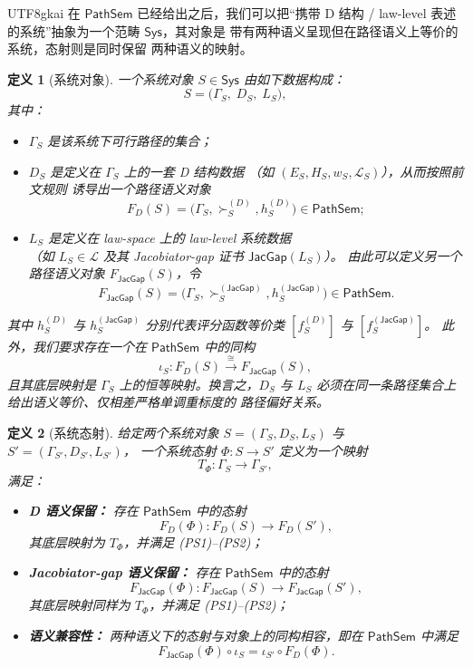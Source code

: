 \documentclass[12pt]{article}
\newtheorem{definition}{定义}[section]
\newcommand{\JacGap}{\mathsf{JacGap}}
\begin{document}
\begin{CJK*}{UTF8}{gkai}
在 $\mathsf{PathSem}$ 已经给出之后，我们可以把“携带 D 结构 /
law-level 表述的系统”抽象为一个范畴 $\mathsf{Sys}$，其对象是
带有两种语义呈现但在路径语义上等价的系统，态射则是同时保留
两种语义的映射。

\begin{definition}[系统对象]
一个\emph{系统对象} $S\in\mathsf{Sys}$ 由如下数据构成：
  \[
    S
    =
    \bigl(
      \Gamma_S,\;
      D_S,\;
      L_S
    \bigr),
  \]
  其中：
  \begin{itemize}
    \item $\Gamma_S$ 是该系统下可行路径的集合；
    \item $D_S$ 是定义在 $\Gamma_S$ 上的一套 D 结构数据
          （如 $(E_S,H_S,w_S,\mathcal{L}_S)$），从而按照前文规则
          诱导出一个路径语义对象
          \[
            F_D(S)
            =
            \bigl(\Gamma_S,\succ^{(D)}_S,h^{(D)}_S\bigr)
            \in\mathsf{PathSem};
          \]
    \item $L_S$ 是定义在 law-space 上的 law-level 系统数据\\
          （如 $L_S\in\mathcal{L}$ 及其 Jacobiator-gap 证书
          $\JacGap(L_S)$）。
          由此可以定义另一个路径语义对象 $F_{\JacGap}(S)$，令
          {\small
          \[
            F_{\JacGap}(S)
            =
            \bigl(\Gamma_S,\succ^{(\JacGap)}_S,h^{(\JacGap)}_S\bigr)
            \in\mathsf{PathSem}.
          \]
          }
  \end{itemize}
  其中 $h^{(D)}_S$ 与 $h^{(\JacGap)}_S$ 分别代表评分函数等价类
  $[f^{(D)}_S]$ 与 $[f^{(\JacGap)}_S]$。
  此外，我们要求存在一个在 $\mathsf{PathSem}$ 中的同构
  \[
    \iota_S:
    F_D(S)
    \xrightarrow{\;\cong\;}
    F_{\JacGap}(S),
  \]
  且其底层映射是 $\Gamma_S$ 上的恒等映射。换言之，$D_S$ 与 $L_S$
  必须在同一条路径集合上给出语义等价、仅相差严格单调重标度的
  路径偏好关系。
\end{definition}

\begin{definition}[系统态射]
给定两个系统对象
  $S=(\Gamma_S,D_S,L_S)$
  与
  $S'=(\Gamma_{S'},D_{S'},L_{S'})$，
  一个\emph{系统态射} $\Phi:S\to S'$ 定义为一个映射
  \[
    T_\Phi:\Gamma_S\longrightarrow\Gamma_{S'},
  \]
  满足：
  \begin{itemize}
    \item[(SM1)] \textbf{D 语义保留：}
      存在 $\mathsf{PathSem}$ 中的态射
      \[
        F_D(\Phi):
        F_D(S)\longrightarrow F_D(S'),
      \]
      其底层映射为 $T_\Phi$，并满足 (PS1)–(PS2)；
    \item[(SM2)] \textbf{Jacobiator-gap 语义保留：}
      存在 $\mathsf{PathSem}$ 中的态射
      \[
        F_{\JacGap}(\Phi):
        F_{\JacGap}(S)\longrightarrow F_{\JacGap}(S'),
      \]
      其底层映射同样为 $T_\Phi$，并满足 (PS1)–(PS2)；
    \item[(SM3)] \textbf{语义兼容性：}
      两种语义下的态射与对象上的同构相容，即在 $\mathsf{PathSem}$
      中满足
      \[
        F_{\JacGap}(\Phi)\circ\iota_S
        =
        \iota_{S'}\circ F_D(\Phi).
      \]
  \end{itemize}
\end{definition}


\end{CJK*}
\end{document}
